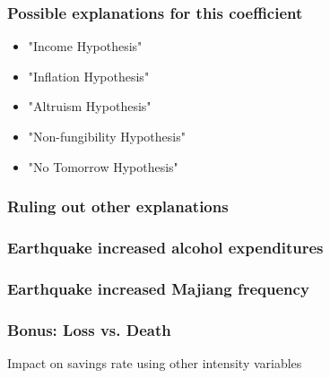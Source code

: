 \documentclass[aspectratio=169]{beamer}
\begin{document}
\begin{frame}
\frametitle{\Large{Possible explanations for this coefficient}}
\begin{itemize}
	\item "Income Hypothesis" 
	\item "Inflation Hypothesis" 	
	\item "Altruism Hypothesis" 
	\item "Non-fungibility Hypothesis" 
	\item "No Tomorrow Hypothesis" 
\end{itemize}
\end{frame}


\begin{frame}
\frametitle{Ruling out other explanations}
    \begin{table}[p]
    	\centering
    	\fontsize{8pt}{8pt}\selectfont
    	
    \end{table}
\end{frame}

\begin{frame}
    \frametitle{\Large{Earthquake increased alcohol expenditures}}
    \begin{table}
    	\centering
    	\scriptsize		
    \end{table}
\end{frame}

\begin{frame}
\frametitle{\Large{Earthquake increased Majiang frequency}}
\begin{table}
	\centering
	\scriptsize		
\end{table}
\end{frame}

\begin{frame}
	\frametitle{Bonus: Loss vs. Death}
	\begin{table}
		\centering
		\caption{\small{Impact on savings rate using other intensity variables}}
		\scriptsize		
	\end{table}
\end{frame}
\end{document}
